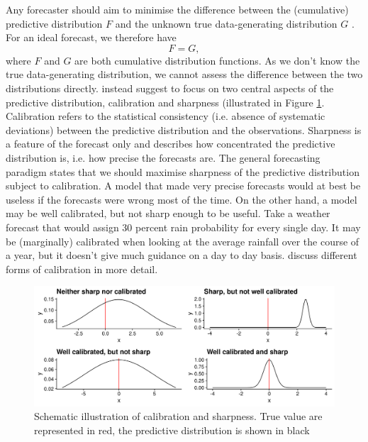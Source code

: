 \documentclass[article,shortnames]{jss}\usepackage[]{graphicx}\usepackage[]{color}
\begin{document}
Any forecaster should aim to minimise the difference between the (cumulative) predictive distribution $F$ and the unknown true data-generating distribution $G$ \citep{gneitingProbabilisticForecastsCalibration2007}. For an ideal forecast, we therefore have 
%
$$ F = G, $$
%
where $F$ and $G$ are both cumulative distribution functions. As we don't know the true data-generating distribution, we cannot assess the difference between the two distributions directly. \cite{gneitingProbabilisticForecastsCalibration2007} instead suggest to focus on two central aspects of the predictive distribution, calibration and sharpness (illustrated in Figure \ref{fig:forecast-paradigm}. Calibration refers to the statistical consistency (i.e. absence of systematic deviations) between the predictive distribution and the observations. Sharpness is a feature of the forecast only and describes how concentrated the predictive distribution is, i.e. how precise the forecasts are. The general forecasting paradigm states that we should maximise sharpness of the predictive distribution subject to calibration. A model that made very precise forecasts would at best be useless if the forecasts were wrong most of the time. On the other hand, a model may be well calibrated, but not sharp enough to be useful. Take a weather forecast that would assign 30 percent rain probability for every single day. It may be (marginally) calibrated when looking at the average rainfall over the course of a year, but it doesn't give much guidance on a day to day basis. \cite{gneitingProbabilisticForecastsCalibration2007} discuss different forms of calibration in more detail. 

\begin{figure}[h]
\centering
\includegraphics{plots/forecast-paradigm.png}
\caption{\label{fig:forecast-paradigm} Schematic illustration of calibration and sharpness. True value are represented in red, the predictive distribution is shown in black}
\end{figure}
\end{document}
